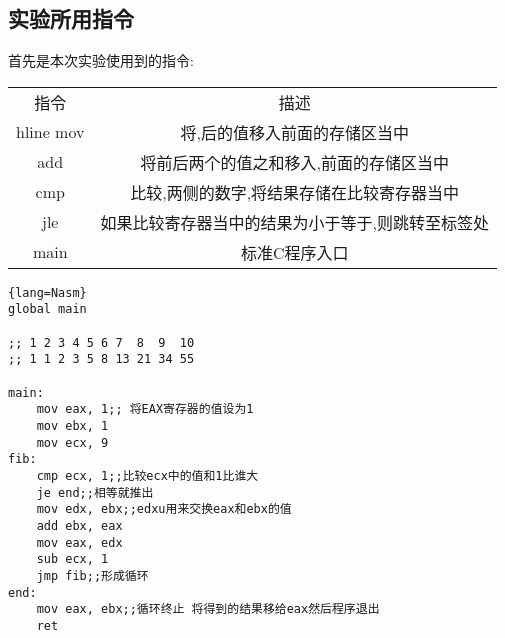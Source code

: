 \documentclass[UTF8]{ctexart}
\begin{document}
\subsection{实验所用指令}
首先是本次实验使用到的指令:
\begin{table}[h]
  \centering
  \begin{tabular}{c|c}
    指令 & 描述 \\hline
    mov  & 将,后的值移入前面的存储区当中\\
    add  & 将前后两个的值之和移入,前面的存储区当中\\
    cmp  & 比较,两侧的数字,将结果存储在比较寄存器当中\\
    jle  & 如果比较寄存器当中的结果为小于等于,则跳转至标签处\\
    main & 标准C程序入口\\
  \end{tabular}
\end{table}
\begin{lstlisting}{lang=Nasm}
global main

;; 1 2 3 4 5 6 7  8  9  10
;; 1 1 2 3 5 8 13 21 34 55

main:
    mov eax, 1;; 将EAX寄存器的值设为1
    mov ebx, 1
    mov ecx, 9
fib:
    cmp ecx, 1;;比较ecx中的值和1比谁大
    je end;;相等就推出
    mov edx, ebx;;edxu用来交换eax和ebx的值
    add ebx, eax
    mov eax, edx
    sub ecx, 1
    jmp fib;;形成循环
end:
    mov eax, ebx;;循环终止 将得到的结果移给eax然后程序退出
    ret

\end{lstlisting}
\end{document}
